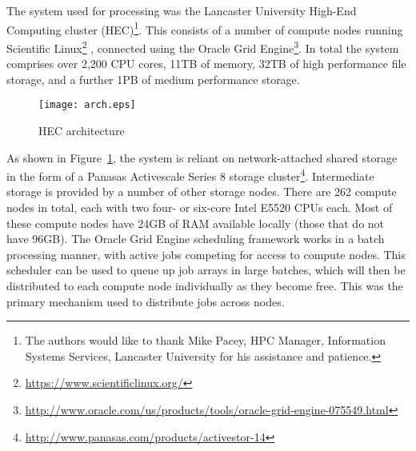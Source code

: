The system used for processing was the Lancaster University High-End Computing cluster (HEC)\footnote{The authors would like to thank Mike Pacey, HPC Manager, Information Systems Services, Lancaster University for his assistance and patience.}.  This consists of a number of compute nodes running Scientific Linux\footnote{\url{https://www.scientificlinux.org/}}%
, connected using the Oracle Grid Engine\footnote{\url{http://www.oracle.com/us/products/tools/oracle-grid-engine-075549.html}}.  
In total the system comprises over 2,200 CPU cores, 11TB of memory, 32TB of high performance file storage, and a further 1PB of medium performance storage.


\begin{figure}[h]
   \centering
   \texttt{[image: arch.eps]}
   \caption{HEC architecture}
\label{fig:arch}
\end{figure}

As shown in Figure~\ref{fig:arch}, the system is reliant on network-attached shared storage in the form of a Panasas Activescale Series 8 storage cluster\footnote{\url{http://www.panasas.com/products/activestor-14}}\cite{Nagle2004PAS1048933.1049998}.  Intermediate storage is provided by a number of other storage nodes.
There are 262 compute nodes in total, each with two four- or six-core Intel E5520 CPUs each.  Most of these compute nodes have 24GB of RAM available locally (those that do not have 96GB).
The Oracle Grid Engine scheduling framework works in a batch processing manner, with active jobs competing for access to compute nodes.  This scheduler can be used to queue up job arrays in large batches, which will then be distributed to each compute node individually as they become free.  This was the primary mechanism used to distribute jobs across nodes.

